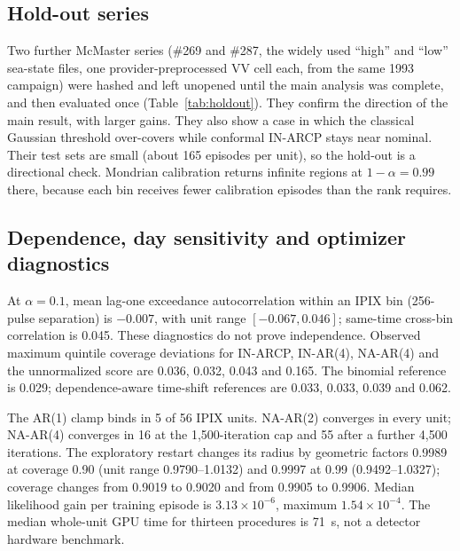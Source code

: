 \documentclass[10pt]{article}
\begin{document}
\subsection{Hold-out series}
Two further McMaster series (\#269 and \#287, the widely used ``high'' and ``low'' sea-state files, one provider-preprocessed VV cell each, from the same 1993 campaign) were hashed and left unopened until the main analysis was complete, and then evaluated once (Table~\ref{tab:holdout}). They confirm the direction of the main result, with larger gains. They also show a case in which the classical Gaussian threshold over-covers while conformal IN-ARCP stays near nominal. Their test sets are small (about 165 episodes per unit), so the hold-out is a directional check. Mondrian calibration returns infinite regions at $1-\alpha=0.99$ there, because each bin receives fewer calibration episodes than the rank requires.
\begin{table}[h]
\centering\small
\caption{Hold-out series \#269 and \#287 ($1-\alpha=0.90$; six units per column).}
\label{tab:holdout}

\end{table}


\subsection{Dependence, day sensitivity and optimizer diagnostics}
At $\alpha=0.1$, mean lag-one exceedance autocorrelation within an IPIX bin (256-pulse separation) is $-0.007$, with unit range $[-0.067,0.046]$; same-time cross-bin correlation is 0.045. These diagnostics do not prove independence. Observed maximum quintile coverage deviations for IN-ARCP, IN-AR(4), NA-AR(4) and the unnormalized score are 0.036, 0.032, 0.043 and 0.165. The binomial reference is 0.029; dependence-aware time-shift references are 0.033, 0.033, 0.039 and 0.062.

The AR(1) clamp binds in 5 of 56 IPIX units. NA-AR(2) converges in every unit; NA-AR(4) converges in 16 at the 1,500-iteration cap and 55 after a further 4,500 iterations. The exploratory restart changes its radius by geometric factors 0.9989 at coverage 0.90 (unit range 0.9790--1.0132) and 0.9997 at 0.99 (0.9492--1.0327); coverage changes from 0.9019 to 0.9020 and from 0.9905 to 0.9906. Median likelihood gain per training episode is $3.13\times10^{-6}$, maximum $1.54\times10^{-4}$. The median whole-unit GPU time for thirteen procedures is 71~s, not a detector hardware benchmark.
\end{document}
